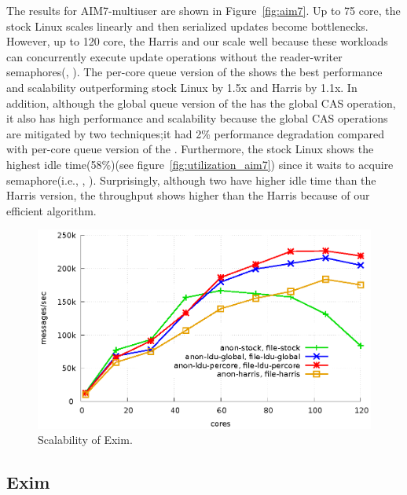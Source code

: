 The results for AIM7-multiuser are shown in Figure~\ref{fig:aim7}.
Up to 75 core, the stock Linux scales linearly and then serialized updates
become bottlenecks.
However, up to 120 core, the Harris and our \LDU scale well because
these workloads can concurrently execute update operations without the
reader-writer semaphores(, ).
The per-core queue version of the \LDU shows the best performance and
scalability outperforming stock Linux by 1.5x and Harris by
1.1x.
In addition, although the global queue version of the \LDU has the global CAS operation, it
also has high performance and scalability because the global CAS operations are
mitigated by two \LDU techniques;it had 2\% performance degradation compared with
per-core queue version of the \LDU.
Furthermore, the stock Linux shows the highest idle time(58\%)(see
figure~\ref{fig:utilization_aim7}) since it waits to acquire semaphore(i.e., , ).
Surprisingly, although two \LDU have higher idle time than the Harris version, the throughput shows higher than the Harris because of our efficient algorithm.
\begin{figure}[tb]
  \begin{center}
    \includegraphics[scale=0.8]{graph/exim.eps}
  \end{center}
  \caption{Scalability of Exim.}
  \label{fig:exim}
\end{figure}

\subsection{Exim}


